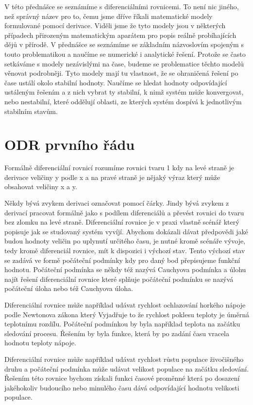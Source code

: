 V této přednášce se seznámíme s diferenciálními rovnicemi. To není nic jiného, než správný název pro to, čemu jsme dříve říkali matematické modely formulované pomocí derivace. Viděli jsme že tyto modely jsou v některých případech přirozeným matematickým aparátem pro popis reálně probíhajících dějů v přírodě. V přednášce se seznámíme se základním názvoslovím spojeným s touto problematikou a naučíme se numerické i analytické řešení. Protože se často setkáváme s modely nezávislými na čase, budeme se problematice těchto modelů věnovat podrobněji. Tyto modely mají tu vlastnost, že se ohraničená řešení po čase ustálí okolo stabilní hodnoty. Naučíme se hledat hodnoty odpovídající ustáleným řešením a z nich vybrat ty stabilní, k nimž systém může konvergovat, nebo nestabilní, které oddělují oblasti, ze kterých systém dospívá k jednotlivým stabilním stavům.

\section*{ODR prvního řádu}

Formálně diferenciální rovnicí rozumíme rovnici tvaru 1 kdy na levé straně je derivace veličiny y podle x a na pravé straně je nějaký výraz který může obsahovat veličiny x a y. 

Někdy bývá zvykem derivaci označovat pomocí čárky. Jindy bývá zvykem z derivací pracovat formálně jako s podílem diferenciálů a převést rovnici do tvaru bez zlomku na levé straně. Diferenciální rovnice je v praxi vlastně scénář který popisuje jak se studovaný systém vyvíjí. Abychom dokázali dávat předpovědi jaké budou hodnoty veličin po uplynutí určitého času, je nutné kromě scénáře vývoje, tedy kromě diferenciál rovnice, mít k dispozici i výchozí stav. Tento výchozí stav se zadává ve formě počáteční podmínky kdy pro daný bod přepisujeme funkční hodnotu. Počáteční podmínka se někdy též nazývá Cauchyova podmínka a úlohu najít řešení diferenciální rovnice které splňuje počáteční podmínku se nazývá počáteční úloha nebo též Cauchyova úloha. 


Diferenciální rovnice může například udávat rychlost ochlazování horkého nápoje podle Newtonova zákona který Vyjadřuje to že rychlost poklesu teploty je úměrná teplotnímu rozdílu. Počáteční podmínkou by byla například teplota na začátku sledování procesu. Řešením by byla funkce, která by po zadání času vracela hodnotu teploty nápoje. 

Diferenciální rovnice může například udávat rychlost růstu populace živočišného druhu a počáteční podmínka může udávat velikost populace na začátku sledování. Řešením této rovnice bychom získali funkci časové proměnné která po dosazení jakéhokoliv budoucího nebo minulého času dává odpovídající hodnotu velikosti populace. 

